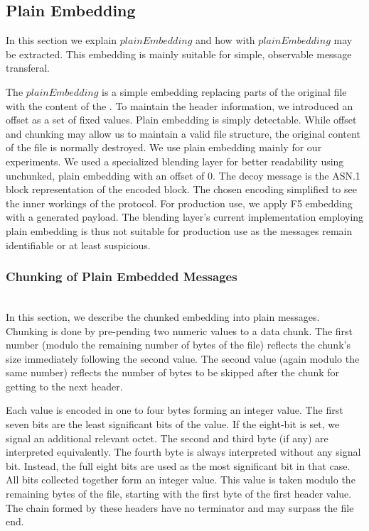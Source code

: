 \subsection{Plain Embedding}
In this section we explain $plainEmbedding$ and how \VortexMessages{} with $plainEmbedding$ may be extracted. This embedding is mainly suitable for simple, observable message transferal.

The $plainEmbedding$ is a simple embedding replacing parts of the original file with the content of the \VortexMessage. To maintain the header information, we introduced an offset as a set of fixed values. Plain embedding is simply detectable. While offset and chunking may allow us to maintain a valid file structure, the original content of the file is normally destroyed. We use plain embedding mainly for our experiments. We used a specialized blending layer for better readability using unchunked, plain embedding with an offset of $0$. The decoy message is the ASN.1 block representation of the encoded block. The chosen encoding simplified to see the inner workings of the protocol. For production use, we apply F5 embedding with a generated payload. The blending layer's current implementation employing plain embedding is thus not suitable for production use as the messages remain identifiable or at least suspicious.

\subsubsection*{Chunking of Plain Embedded Messages}\label{sec:chunkingPlain}~\\
In this section, we describe the chunked embedding into plain messages. Chunking is done by pre-pending two numeric values to a data chunk. The first number (modulo the remaining number of bytes of the file) reflects the chunk's size immediately following the second value. The second value (again modulo the same number)  reflects the number of bytes to be skipped after the chunk for getting to the next header.

Each value is encoded in one to four bytes forming an integer value. The first seven bits are the least significant bits of the value. If the eight-bit is set, we signal an additional relevant octet. The second and third byte (if any) are interpreted equivalently. The fourth byte is always interpreted without any signal bit. Instead, the full eight bits are used as the most significant bit in that case. All bits collected together form an integer value. This value is taken modulo the remaining bytes of the file, starting with the first byte of the first header value. The chain formed by these headers have no terminator and may surpass the file end.

